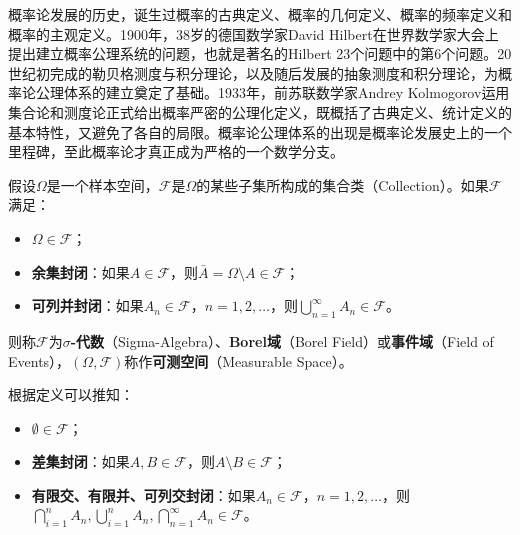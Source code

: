 概率论发展的历史，诞生过概率的古典定义、概率的几何定义、概率的频率定义和概率的主观定义。1900年，38岁的德国数学家David Hilbert在世界数学家大会上提出建立概率公理系统的问题，也就是著名的Hilbert 23个问题中的第6个问题。20世纪初完成的勒贝格测度与积分理论，以及随后发展的抽象测度和积分理论，为概率论公理体系的建立奠定了基础。1933年，前苏联数学家Andrey Kolmogorov\cite{Kolmogorov1951Foundations}运用集合论和测度论正式给出概率严密的公理化定义，既概括了古典定义、统计定义的基本特性，又避免了各自的局限。概率论公理体系的出现是概率论发展史上的一个里程碑，至此概率论才真正成为严格的一个数学分支。

\begin{definition}
假设$\Omega$是一个样本空间，$\mathscr F$是$\Omega$的某些子集所构成的集合类（Collection）。如果$\mathscr F$满足：
\begin{itemize}
  \item $\Omega\in \mathscr F$；
  \item \textbf{余集封闭}：如果$A\in \mathscr F$，则$\bar A=\Omega\setminus A\in \mathscr F$；
  \item \textbf{可列并封闭}：如果$A_n\in \mathscr F$，$n=1,2,\ldots$，则$\bigcup\limits_{n=1}^{\infty}A_n\in \mathscr F$。
\end{itemize}
则称$\mathscr F$为\textbf{$\sigma$-代数}（Sigma-Algebra）、\textbf{Borel域}（Borel Field）或\textbf{事件域}（Field of Events），$(\Omega,\mathscr F)$称作\textbf{可测空间}（Measurable Space）。
\end{definition}
根据定义可以推知：
\begin{itemize}
  \item $\emptyset\in \mathscr F$；
  \item \textbf{差集封闭}：如果$A,B\in \mathscr F$，则$A\setminus B\in \mathscr F$；
  \item \textbf{有限交、有限并、可列交封闭}：如果$A_n\in \mathscr F$，$n=1,2,\ldots$，则$\bigcap\limits_{i=1}^n A_n, \bigcup\limits_{i=1}^n A_n, \bigcap\limits_{n=1}^{\infty}A_n\in \mathscr F$。
\end{itemize}

